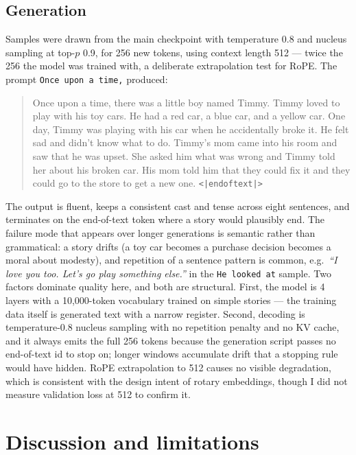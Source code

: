 \documentclass{article}
\newcommand{\eot}{\texttt{<|endoftext|>}}
\begin{document}
\subsection{Generation}

Samples were drawn from the main checkpoint with temperature 0.8 and nucleus sampling at top-$p$ 0.9, for 256 new tokens, using context length 512 --- twice the 256 the model was trained with, a deliberate extrapolation test for RoPE. The prompt \texttt{Once upon a time,} produced:

\begin{quote}
\small
Once upon a time, there was a little boy named Timmy. Timmy loved to play with his toy cars. He had a red car, a blue car, and a yellow car. One day, Timmy was playing with his car when he accidentally broke it. He felt sad and didn't know what to do. Timmy's mom came into his room and saw that he was upset. She asked him what was wrong and Timmy told her about his broken car. His mom told him that they could fix it and they could go to the store to get a new one. \eot{}
\end{quote}

The output is fluent, keeps a consistent cast and tense across eight sentences, and terminates on the end-of-text token where a story would plausibly end. The failure mode that appears over longer generations is semantic rather than grammatical: a story drifts (a toy car becomes a purchase decision becomes a moral about modesty), and repetition of a sentence pattern is common, e.g.\ \emph{``I love you too. Let's go play something else.''} in the \texttt{He looked at} sample. Two factors dominate quality here, and both are structural. First, the model is 4 layers with a 10{,}000-token vocabulary trained on simple stories --- the training data itself is generated text with a narrow register. Second, decoding is temperature-0.8 nucleus sampling with no repetition penalty and no KV cache, and it always emits the full 256 tokens because the generation script passes no end-of-text id to stop on; longer windows accumulate drift that a stopping rule would have hidden. RoPE extrapolation to 512 causes no visible degradation, which is consistent with the design intent of rotary embeddings, though I did not measure validation loss at 512 to confirm it.

\section{Discussion and limitations}
\label{sec:discussion}
\end{document}
